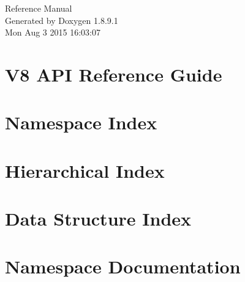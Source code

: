 \documentclass[twoside]{book}
\newcommand{\+}{\discretionary{\mbox{\scriptsize$\hookleftarrow$}}{}{}}
\newcommand{\clearemptydoublepage}{%
  \newpage{\pagestyle{empty}\cleardoublepage}%
}
\begin{document}
\hypersetup{pageanchor=false,
             bookmarks=true,
             bookmarksnumbered=true,
             pdfencoding=unicode
            }
\begin{titlepage}
\vspace*{7cm}
\begin{center}%
{\Large Reference Manual}\\
\vspace*{1cm}
{\large Generated by Doxygen 1.8.9.1}\\
\vspace*{0.5cm}
{\small Mon Aug 3 2015 16:03:07}\\
\end{center}
\end{titlepage}
\clearemptydoublepage
\tableofcontents
\clearemptydoublepage
{}
\hypersetup{pageanchor=true}

\chapter{V8 A\+P\+I Reference Guide}
\label{index}\hypertarget{index}{}
\chapter{Namespace Index}

\chapter{Hierarchical Index}

\chapter{Data Structure Index}

\chapter{Namespace Documentation}

\end{document}
